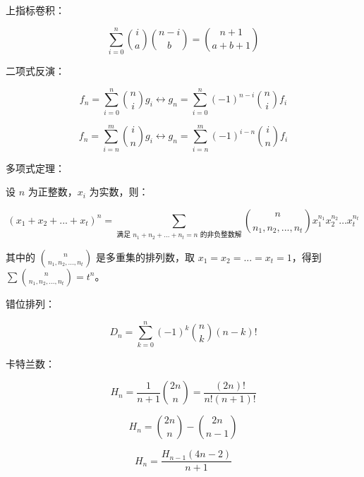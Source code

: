 上指标卷积：

$$\sum_{i=0}^n \binom{i}{a}\binom{n-i}{b}=\binom{n+1}{a+b+1}$$

二项式反演：

$$f_n=\sum_{i=0}^n \binom{n}{i}g_i \leftrightarrow g_n=\sum_{i=0}^n (-1)^{n-i} \binom{n}{i} f_i$$

$$f_n=\sum_{i=n}^m \binom{i}{n} g_i \leftrightarrow g_n=\sum_{i=n}^m (-1)^{i-n}\binom{i}{n}f_i$$

多项式定理：

设 $n$ 为正整数，$x_i$ 为实数，则：

$$(x_1+x_2+...+x_t)^n=\sum_{\text{满足 $n_1+n_2+...+n_t=n$ 的非负整数解}} \binom{n}{n_1,n_2,...,n_t}x_1^{n_1}x_2^{n_2}\dots x_t^{n_t}$$

其中的 $\binom{n}{n_1,n_2,...,n_t}$ 是多重集的排列数，取 $x_1=x_2=...=x_t=1$，得到 $\sum \binom{n}{n_1,n_2,...,n_t}=t^n$。

错位排列：

$$D_n=\sum_{k=0}^n(-1)^k\binom{n}{k}(n-k)!$$

卡特兰数：

$$H_n=\frac{1}{n+1}\binom{2n}{n}=\frac{(2n)!}{n!(n+1)!}$$

$$H_n=\binom{2n}{n}-\binom{2n}{n-1}$$

$$H_n=\frac{H_{n-1}(4n-2)}{n+1}$$


